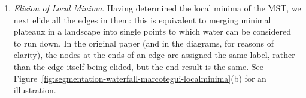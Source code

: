 \begin{enumerate}
\begin{stusubfig}{p}
	\hspace{4mm}%
\caption{Finding and eliding a graph's local minima}
\label{fig:segmentation-waterfall-marcotegui-localminima}
\end{stusubfig}

\item \emph{Elision of Local Minima}. Having determined the local minima of the MST, we next elide all the edges in them: this is equivalent to merging minimal plateaux in a landscape into single points to which water can be considered to run down. In the original paper (and in the diagrams, for reasons of clarity), the nodes at the ends of an edge are assigned the same label, rather than the edge itself being elided, but the end result is the same. See Figure~\ref{fig:segmentation-waterfall-marcotegui-localminima}(b) for an illustration.


\end{enumerate}
